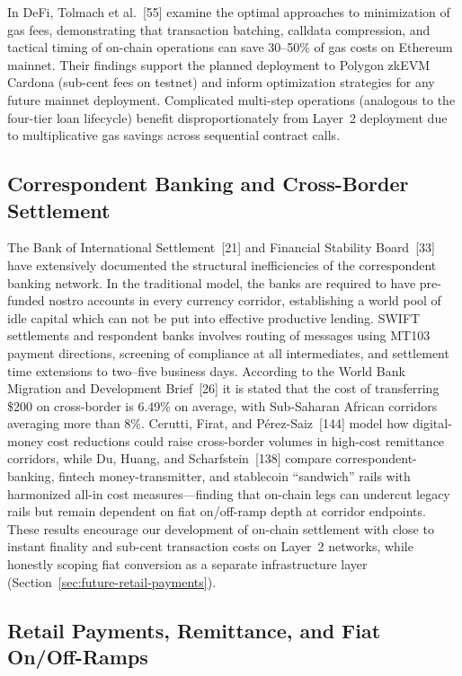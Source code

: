 \documentclass[12pt,a4paper]{report}
\begin{document}
In DeFi, Tolmach et al.~[55] examine the optimal approaches to minimization of gas fees, demonstrating that transaction batching, calldata compression, and tactical timing of on-chain operations can save 30--50\% of gas costs on Ethereum mainnet. Their findings support the planned deployment to Polygon zkEVM Cardona (sub-cent fees on testnet) and inform optimization strategies for any future mainnet deployment. Complicated multi-step operations (analogous to the four-tier loan lifecycle) benefit disproportionately from Layer~2 deployment due to multiplicative gas savings across sequential contract calls.

\subsection{Correspondent Banking and Cross-Border Settlement}

The Bank of International Settlement~[21] and Financial Stability Board~[33] have extensively documented the structural inefficiencies of the correspondent banking network. In the traditional model, the banks are required to have pre-funded nostro accounts in every currency corridor, establishing a world pool of idle capital which can not be put into effective productive lending. SWIFT settlements and respondent banks involves routing of messages using MT103 payment directions, screening of compliance at all intermediates, and settlement time extensions to two--five business days. According to the World Bank Migration and Development Brief~[26] it is stated that the cost of transferring \$200 on cross-border is 6.49\% on average, with Sub-Saharan African corridors averaging more than 8\%. Cerutti, Firat, and P\'{e}rez-Saiz~[144] model how digital-money cost reductions could raise cross-border volumes in high-cost remittance corridors, while Du, Huang, and Scharfstein~[138] compare correspondent-banking, fintech money-transmitter, and stablecoin ``sandwich'' rails with harmonized all-in cost measures---finding that on-chain legs can undercut legacy rails but remain dependent on fiat on/off-ramp depth at corridor endpoints. These results encourage our development of on-chain settlement with close to instant finality and sub-cent transaction costs on Layer~2 networks, while honestly scoping fiat conversion as a separate infrastructure layer (Section~\ref{sec:future-retail-payments}).

\subsection{Retail Payments, Remittance, and Fiat On/Off-Ramps}
\label{sec:lit-retail-payments}
\end{document}
